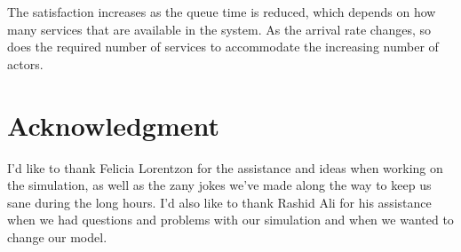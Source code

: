 \documentclass[conference]{IEEEtran}
\begin{document}
The satisfaction increases as the queue time is reduced, which
depends on how many services that are available in the system. As
the arrival rate changes, so does the required number of services
to accommodate the increasing number of actors.

\section*{Acknowledgment}
\label{sec:acknowledgment}

I'd like to thank Felicia Lorentzon for the assistance and ideas
when working on the simulation, as well as the zany jokes we've
made along the way to keep us sane during the long hours. I'd also
like to thank Rashid Ali for his assistance when we had questions
and problems with our simulation and when we wanted to change our
model.

\printbibliography
\end{document}
